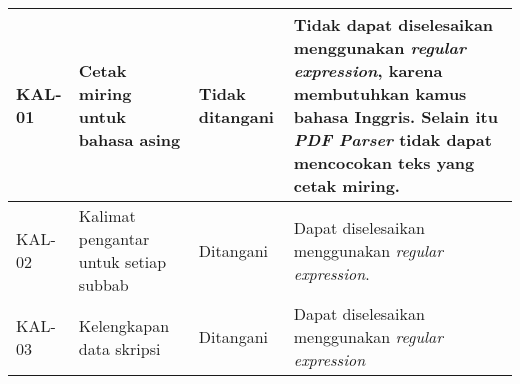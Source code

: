 \begin{table}[H]
\begin{center}
\begin{tabular}{|p{1.5 cm}|>{\raggedright} p{4.3 cm}| p{2.2 cm}| p{6.5 cm}|}
		\hline 
		KAL-01 & Cetak miring untuk bahasa asing & Tidak \newline ditangani & Tidak dapat diselesaikan menggunakan \textit{regular expression}, karena membutuhkan kamus bahasa Inggris. Selain itu \textit{PDF Parser} tidak dapat mencocokan teks yang cetak miring. \newline \\ 
		\hline 
		KAL-02 & Kalimat pengantar untuk setiap subbab & Ditangani & Dapat diselesaikan menggunakan \textit{regular expression}. \newline \\ 
		\hline 
		KAL-03 & Kelengkapan data skripsi & Ditangani & Dapat diselesaikan menggunakan \textit{regular expression} \newline \\ 
		\hline  
		\end{tabular}
	\end{center}
\end{table}

